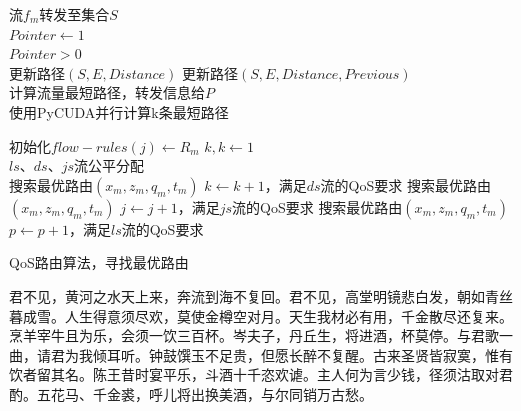 \documentclass[a4paper, UTF8]{ctexart}
\begin{document}
\begin{multicols}{2}
	\renewcommand{\algorithmcfname}{算法}  %
	\begin{algorithm}[H]
		\renewcommand{\thealgocf}{1}     %
		\SetAlgoLined
		流$f_m$转发至集合$S$\\
		$Pointer\gets 1$\\
		{
			$Pointer > 0$\\
			更新路径$(S,E,Distance)$
		}	
		更新路径$(S,E,Distance,Previous)$\\
		计算流量最短路径，转发信息给$P$\\
		\caption{使用PyCUDA并行计算k条最短路径}
	\end{algorithm}		
	
	\begin{algorithm}[H]
		\renewcommand{\thealgocf}{2}     %
		\SetAlgoLined
		{
			初始化$flow-rules(j)\gets R_m$
		}	
		$k,k\gets 1$\\
		{
			$ls$、$ds$、$js$流公平分配\\
			{
				{
					搜索最优路由$(x_m,z_m,q_m,t_m)$
					$k\gets k+1$，满足$ds$流的QoS要求
				}
			}
			{
				{
					搜索最优路由$(x_m,z_m,q_m,t_m)$
					$j\gets j+1$，满足$js$流的QoS要求
				}
			}
			{
				{
					搜索最优路由$(x_m,z_m,q_m,t_m)$
					$p\gets p+1$，满足$ls$流的QoS要求
				}
			}
		}	
		\caption{QoS路由算法，寻找最优路由}
	\end{algorithm}	
	
	君不见，黄河之水天上来，奔流到海不复回。君不见，高堂明镜悲白发，朝如青丝暮成雪。人生得意须尽欢，莫使金樽空对月。天生我材必有用，千金散尽还复来。烹羊宰牛且为乐，会须一饮三百杯。岑夫子，丹丘生，将进酒，杯莫停。与君歌一曲，请君为我倾耳听。钟鼓馔玉不足贵，但愿长醉不复醒。古来圣贤皆寂寞，惟有饮者留其名。陈王昔时宴平乐，斗酒十千恣欢谑。主人何为言少钱，径须沽取对君酌。五花马、千金裘，呼儿将出换美酒，与尔同销万古愁。
	

\end{multicols}
\end{document}
